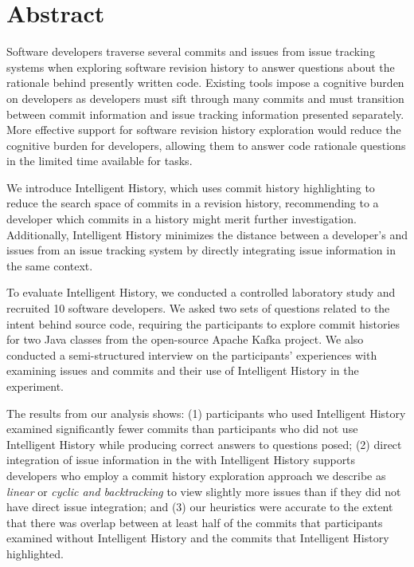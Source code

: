 
\chapter{Abstract}


Software developers traverse several commits and issues from issue tracking systems 
when exploring software revision history to answer questions about the rationale behind presently written code.
Existing tools impose a cognitive burden on developers as developers 
must sift through many commits and must transition between commit information 
and issue tracking information presented separately.
More effective support for software revision history exploration would 
reduce the cognitive burden for developers, allowing them to answer code 
rationale questions in the limited time available for tasks.

We introduce Intelligent History, which uses commit history highlighting to reduce the search space of 
commits in a revision history, recommending to a developer which commits in a history might merit further investigation.
Additionally, Intelligent History minimizes the distance between a developer's  and issues from an issue tracking system
by directly integrating issue information in the same context.

To evaluate Intelligent History, we conducted a controlled laboratory study and recruited 10 software developers.
We asked two sets of questions related to the intent behind source code, requiring the participants to explore 
commit histories for two Java classes from the open-source Apache Kafka project.
We also conducted a semi-structured interview on the participants' experiences with examining issues and commits 
and their use of Intelligent History in the experiment.

The results from our analysis shows:
(1) participants who used Intelligent History examined significantly
fewer commits than participants who did not use Intelligent History
while producing correct answers to questions posed;
(2) direct integration of issue information in the 
with Intelligent History supports developers who employ a commit history exploration approach
we describe as \textit{linear} or \textit{cyclic and backtracking} to view slightly more issues than if they did not have
direct issue integration; and
(3) our heuristics were accurate to the extent that there was overlap between at least half of the commits
that participants examined without Intelligent History and the commits that Intelligent History
highlighted.

